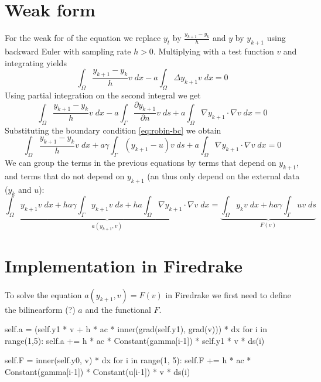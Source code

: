 \documentclass[
12pt, %
a4paper, %
onecolumn, %
portrait %
]{article}
\begin{document}
\section{Weak form}
For the weak for of the equation we replace $y_t$ by $\frac{y_{k+1} - y_k}{h}$ and $y$ by $y_{k+1}$ using backward Euler with sampling rate $h > 0$. Multiplying with a test function $v$ and integrating yields
\begin{equation}
\int_{\Omega} \frac{y_{k+1} - y_k}{h} v \; dx - a \int_{\Omega} \Delta y_{k+1} v \; dx = 0
\end{equation}
Using partial integration on the second integral we get
\begin{equation}
\int_{\Omega} \frac{y_{k+1} - y_k}{h} v \; dx - a \int_{\Gamma} \frac{\partial y_{k+1}}{\partial n} v \; ds + a \int_{\Omega} \nabla y_{k+1} \cdot \nabla v \; dx = 0
\end{equation}
Substituting the boundary condition \eqref{eq:robin-bc} we obtain
\begin{equation}
\int_{\Omega} \frac{y_{k+1} - y_k}{h} v \; dx + a \gamma \int_{\Gamma}  (y_{k+1} - u) v \; ds + a \int_{\Omega} \nabla y_{k+1} \cdot \nabla v \; dx = 0
\end{equation}
We can group the terms in the previous equations by terms that depend on $y_{k+1}$, and terms that do not depend on $y_{k+1}$ (an thus only depend on the external data ($y_k$ and $u$):
\begin{equation}
\underbrace{
\int_{\Omega} y_{k+1} v \; dx + h a \gamma \int_{\Gamma} y_{k+1} v \; ds + h a \int_{\Omega} \nabla y_{k+1} \cdot \nabla v \; dx
}_{a(y_{k+1}, v)}
 = 
\underbrace{ 
\int_{\Omega} y_k v \; dx + h a \gamma \int_{\Gamma} u v \; ds
}_{F(v)}
\end{equation}

\section{Implementation in Firedrake}
To solve the equation $a(y_{k+1}, v) = F(v)$ in Firedrake we first need to define the bilinearform (?) $a$ and the functional $F$.

\begin{python}
self.a = (self.y1 * v + h * ac * inner(grad(self.y1), grad(v))) * dx
for i in range(1,5):
    self.a += h * ac * Constant(gamma[i-1]) * self.y1 * v * ds(i)
\end{python}


\begin{python}
self.F = inner(self.y0, v) * dx
for i in range(1, 5):
    self.F += h * ac * Constant(gamma[i-1]) * Constant(u[i-1]) * v * ds(i)
\end{python}

\newpage

\renewcommand{\refname}{Reference} %




\end{document}
